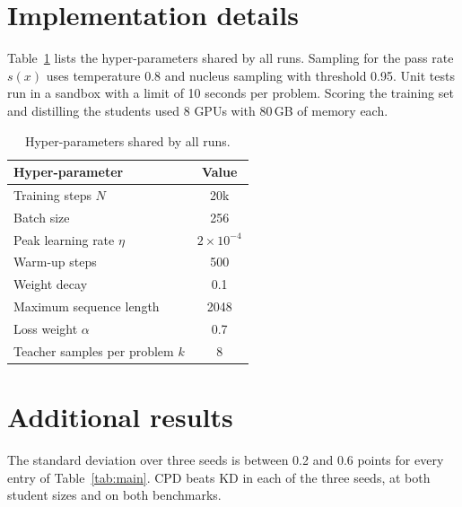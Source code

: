 \documentclass{article} %
\begin{document}



\appendix

\section{Implementation details}
\label{app:impl}

Table~\ref{tab:hparams} lists the hyper-parameters shared by all runs.
Sampling for the pass rate $s(x)$ uses temperature 0.8 and nucleus sampling with threshold 0.95.
Unit tests run in a sandbox with a limit of 10 seconds per problem.
Scoring the training set and distilling the students used 8 GPUs with 80\,GB of memory each.

\begin{table}[h]
\caption{Hyper-parameters shared by all runs.}
\label{tab:hparams}
\centering
\begin{tabular}{lc}
\toprule
Hyper-parameter & Value \\
\midrule
Training steps $N$ & 20k \\
Batch size & 256 \\
Peak learning rate $\eta$ & $2 \times 10^{-4}$ \\
Warm-up steps & 500 \\
Weight decay & 0.1 \\
Maximum sequence length & 2048 \\
Loss weight $\alpha$ & 0.7 \\
Teacher samples per problem $k$ & 8 \\
\bottomrule
\end{tabular}
\end{table}

\section{Additional results}
\label{app:results}

The standard deviation over three seeds is between 0.2 and 0.6 points for every entry of Table~\ref{tab:main}.
CPD beats KD in each of the three seeds, at both student sizes and on both benchmarks.
\end{document}
